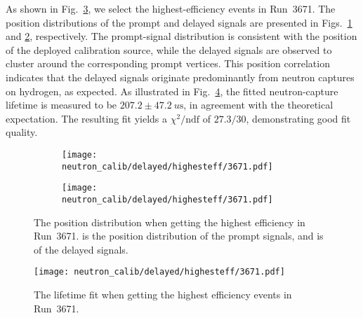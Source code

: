 As shown in Fig.~\ref{fig:highestEffPos}, we select the highest-efficiency events in Run~3671.
The position distributions of the prompt and delayed signals are presented in Figs.~\ref{fig:3671HighestEffProPos} and \ref{fig:3671HighestEffDelPos}, respectively.
The prompt-signal distribution is consistent with the position of the deployed calibration source, while the delayed signals are observed to cluster around the corresponding prompt vertices.
This position correlation indicates that the delayed signals originate predominantly from neutron captures on hydrogen, as expected.
As illustrated in Fig.~\ref{fig:3671_HighestEffDtFit}, the fitted neutron-capture lifetime is measured to be $207.2 \pm \SI{47.2}{u\second}$, in agreement with the theoretical expectation.
The resulting fit yields a $\chi^{2}/\mathrm{ndf}$ of $27.3/30$, demonstrating good fit quality.

\begin{figure}[h]
	\begin{subfigure}{0.5\textwidth}
		\centering
		\texttt{[image: neutron\_calib/delayed/highesteff/3671.pdf]}
		\caption{}
		\label{fig:3671HighestEffProPos}
	\end{subfigure}%
	\begin{subfigure}{0.5\textwidth}
		\centering
		\texttt{[image: neutron\_calib/delayed/highesteff/3671.pdf]}
		\caption{}
		\label{fig:3671HighestEffDelPos}
	\end{subfigure}
	\caption{The position distribution when getting the highest efficiency in Run~3671.  is the position distribution of the prompt signals, and  is of the delayed signals.}
	\label{fig:highestEffPos}
\end{figure}
\begin{figure}[H]
	\centering
	\texttt{[image: neutron\_calib/delayed/highesteff/3671.pdf]}
	\caption{The lifetime fit when getting the highest efficiency events in Run~3671.}
	\label{fig:3671_HighestEffDtFit}
\end{figure}

